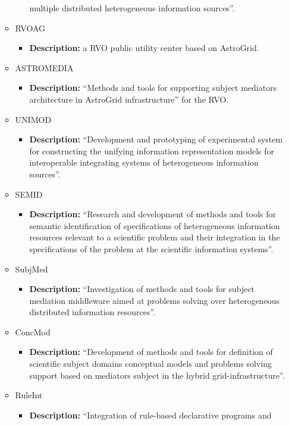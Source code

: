 \begin{itemize}
\begin{itemize}
\begin{itemize}
multiple distributed he\-te\-ro\-ge\-neous information sources''.
\end{itemize}
\item RVOAG
\begin{itemize}
\item \textbf{Description:} a RVO public utility center based on AstroGrid.
\end{itemize}
\item ASTROMEDIA
\begin{itemize}
\item \textbf{Description:} ``Methods and tools for supporting subject mediators
architecture in AstroGrid infrastructure'' for the RVO.
\end{itemize}
\item UNIMOD
\begin{itemize}
\item \textbf{Description:} ``Development and prototyping of experimental system
for constructing the unifying information representation models for
interoperable integrating systems of heterogeneous information sources''.
\end{itemize}
\item SEMID
\begin{itemize}
\item \textbf{Description:} ``Research and development of methods and tools for
semantic identification of specifications of heterogeneous information resources
relevant to a scientific problem and their integration in the specifications of
the problem at the scientific information systems''.
\end{itemize}
\item SubjMed
\begin{itemize}
\item \textbf{Description:} ``Investigation of methods and tools for subject
mediation middleware aimed at problems solving over heterogeneous distributed
information resources''.
\end{itemize}
\item ConcMod
\begin{itemize}
\item \textbf{Description:} ``Development of methods and tools for definition of
scientific subject domains conceptual models and problems solving support based
on mediators subject in the hybrid grid-infrastructure''.
\end{itemize}
\item RuleInt
\begin{itemize}
\item \textbf{Description:} ``Integration of rule-based declarative programs and

\end{itemize}
\end{itemize}
\end{itemize}
